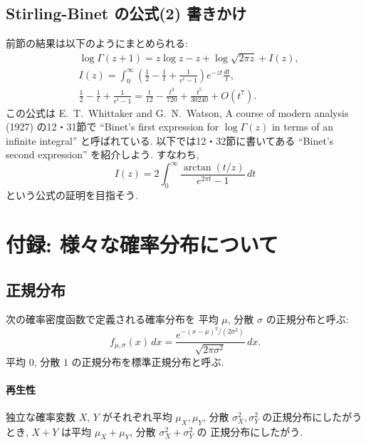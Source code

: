 \documentclass[12pt,twoside]{jarticle}
\theoremstyle{jplain}
\theoremstyle{jplain}
\theoremstyle{jplain}
\numberwithin{theorem}{section}
\numberwithin{equation}{section}
\numberwithin{figure}{section}
\numberwithin{table}{section}
\begin{document}
\subsection{Stirling-Binet の公式(2) 書きかけ}
\label{sec:Binet2}

前節の結果は以下のようにまとめられる:
\begin{align*}
&
\log\Gamma(z+1)=z\log z-z+\log\sqrt{2\pi z}+I(z),
\\ &
I(z)=\int_0^\infty\left(\frac{1}{2}-\frac{1}{t}+\frac{1}{e^t-1}\right)e^{-zt}\frac{dt}{t},
\\ &
\frac{1}{2}-\frac{1}{t}+\frac{1}{e^t-1}
=\frac{t}{12}-\frac{t^3}{720}+\frac{t^5}{30240}+O(t^7).
\end{align*}
この公式は E.~T.~Whittaker and G.~N.~Watson, A course of modern analysis (1927)
の12・31節で ``Binet's first expression for $\log\Gamma(z)$ in terms of an infinite integral''
と呼ばれている. 以下では12・32節に書いてある ``Binet's second expression'' を紹介しよう.
すなわち,
\[
I(z)=2\int_0^\infty \frac{\arctan(t/z)}{e^{2\pi t}-1}\,dt
\]
という公式の証明を目指そう.

\bigskip


\section{付録: 様々な確率分布について}
\label{sec:dists}








\subsection{正規分布}
\label{sec:normal}

次の確率密度函数で定義される確率分布を
平均 $\mu$, 分散 $\sigma$ の正規分布と呼ぶ:
\[
f_{\mu,\sigma}(x)\,dx
=\frac{e^{-(x-\mu)^2/(2\sigma^2)}}{\sqrt{2\pi \sigma^2}}\,dx.
\]
平均 $0$, 分散 $1$ の正規分布を標準正規分布と呼ぶ.

\paragraph{再生性}
独立な確率変数 $X$, $Y$ がそれぞれ平均 $\mu_X,\mu_Y$, 分散 $\sigma_X^2,\sigma_Y^2$
の正規分布にしたがうとき, $X+Y$ は平均 $\mu_X+\mu_Y$, 分散 $\sigma_X^2+\sigma_Y^2$ の
正規分布にしたがう.
\end{document}
